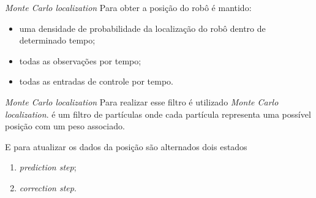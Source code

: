 \begin{frame}[c]{\textit{Monte Carlo localization}}
    Para obter a posição do robô é mantido:
    \newline

    \begin{itemize}
        \item uma densidade de probabilidade da localização do robô dentro de determinado tempo;
        \item todas as observações por tempo;
        \item todas as entradas de controle por tempo.
    \end{itemize}

\end{frame}

\begin{frame}[c]{\textit{Monte Carlo localization}}
    Para realizar esse filtro é utilizado \textit{Monte Carlo localization}. é um filtro de partículas onde cada partícula representa uma possível posição com um peso associado.

    E para atualizar os dados da posição são alternados dois estados
    \newline

    \begin{enumerate}
        \item \textit{prediction step};
        \item \textit{correction step}.
    \end{enumerate}

\end{frame}

